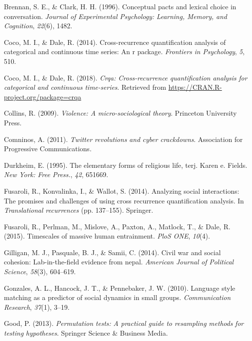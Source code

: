 \documentclass[english,man]{apa6}
\begin{document}
\leavevmode\hypertarget{ref-brennan1996conceptual}{}%
Brennan, S. E., \& Clark, H. H. (1996). Conceptual pacts and lexical choice in conversation. \emph{Journal of Experimental Psychology: Learning, Memory, and Cognition}, \emph{22}(6), 1482.

\leavevmode\hypertarget{ref-coco2014cross}{}%
Coco, M. I., \& Dale, R. (2014). Cross-recurrence quantification analysis of categorical and continuous time series: An r package. \emph{Frontiers in Psychology}, \emph{5}, 510.

\leavevmode\hypertarget{ref-R-crqa}{}%
Coco, M. I., \& Dale, R. (2018). \emph{Crqa: Cross-recurrence quantification analysis for categorical and continuous time-series}. Retrieved from \url{https://CRAN.R-project.org/package=crqa}

\leavevmode\hypertarget{ref-collins2009violence}{}%
Collins, R. (2009). \emph{Violence: A micro-sociological theory}. Princeton University Press.

\leavevmode\hypertarget{ref-comninos2011twitter}{}%
Comninos, A. (2011). \emph{Twitter revolutions and cyber crackdowns}. Association for Progressive Communications.

\leavevmode\hypertarget{ref-durkheim1995elementary}{}%
Durkheim, E. (1995). The elementary forms of religious life, terj. Karen e. Fields. \emph{New York: Free Press.}, \emph{42}, 651669.

\leavevmode\hypertarget{ref-fusaroli2014analyzing}{}%
Fusaroli, R., Konvalinka, I., \& Wallot, S. (2014). Analyzing social interactions: The promises and challenges of using cross recurrence quantification analysis. In \emph{Translational recurrences} (pp. 137--155). Springer.

\leavevmode\hypertarget{ref-fusaroli2015timescales}{}%
Fusaroli, R., Perlman, M., Mislove, A., Paxton, A., Matlock, T., \& Dale, R. (2015). Timescales of massive human entrainment. \emph{PloS ONE}, \emph{10}(4).

\leavevmode\hypertarget{ref-gilligan2014civil}{}%
Gilligan, M. J., Pasquale, B. J., \& Samii, C. (2014). Civil war and social cohesion: Lab-in-the-field evidence from nepal. \emph{American Journal of Political Science}, \emph{58}(3), 604--619.

\leavevmode\hypertarget{ref-gonzales2010language}{}%
Gonzales, A. L., Hancock, J. T., \& Pennebaker, J. W. (2010). Language style matching as a predictor of social dynamics in small groups. \emph{Communication Research}, \emph{37}(1), 3--19.

\leavevmode\hypertarget{ref-good2013permutation}{}%
Good, P. (2013). \emph{Permutation tests: A practical guide to resampling methods for testing hypotheses}. Springer Science \& Business Media.
\end{document}
